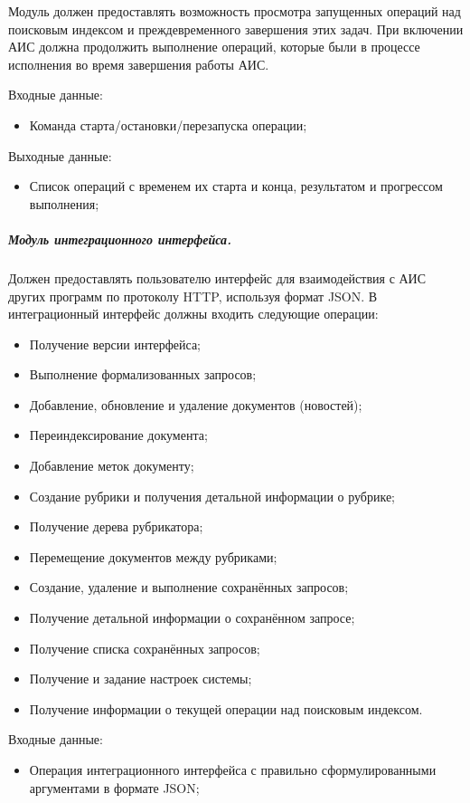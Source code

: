 Модуль должен предоставлять возможность просмотра запущенных операций над поисковым индексом и преждевременного завершения этих задач. При включении АИС должна продолжить выполнение операций, которые были в процессе исполнения во время завершения работы АИС.

Входные данные:
\begin{itemize}
\item Команда старта/остановки/перезапуска операции;
\end{itemize}

Выходные данные:
\begin{itemize}
\item Список операций с временем их старта и конца, результатом и прогрессом выполнения;
\end{itemize}

\subparagraph{Модуль интеграционного интерфейса.}

Должен предоставлять пользователю интерфейс для взаимодействия с АИС других программ по протоколу HTTP, используя формат JSON. В интеграционный интерфейс должны входить следующие операции:
\begin{itemize}
\item Получение версии интерфейса;
\item Выполнение формализованных запросов;
\item Добавление, обновление и удаление документов (новостей);
\item Переиндексирование документа;
\item Добавление меток документу;
\item Создание рубрики и получения детальной информации о рубрике;
\item Получение дерева рубрикатора;
\item Перемещение документов между рубриками;
\item Создание, удаление и выполнение сохранённых запросов;
\item Получение детальной информации о сохранённом запросе;
\item Получение списка сохранённых запросов;
\item Получение и задание настроек системы;
\item Получение информации о текущей операции над поисковым индексом.
\end{itemize}

Входные данные:
\begin{itemize}
\item Операция интеграционного интерфейса с правильно сформулированными аргументами в формате JSON;
\end{itemize}

